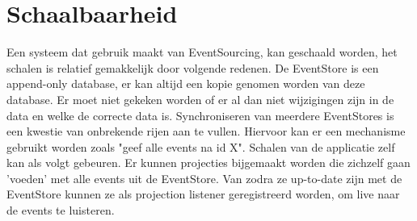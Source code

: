 
\chapter{Schaalbaarheid}
\label{ch:schaalbaarheid}

Een systeem dat gebruik maakt van EventSourcing, kan geschaald worden, het schalen is relatief gemakkelijk door volgende redenen.
De EventStore is een append-only database, er kan altijd een kopie genomen worden van deze database. Er moet niet gekeken worden of er al dan niet wijzigingen zijn in de data en welke de correcte data is. Synchroniseren van meerdere EventStores is een kwestie van onbrekende rijen aan te vullen. Hiervoor kan er een mechanisme gebruikt worden zoals "geef alle events na id X".
Schalen van de applicatie zelf kan als volgt gebeuren. Er kunnen projecties bijgemaakt worden die zichzelf gaan 'voeden' met alle events uit de EventStore. Van zodra ze up-to-date zijn met de EventStore kunnen ze als projection listener geregistreerd worden, om live naar de events te luisteren.